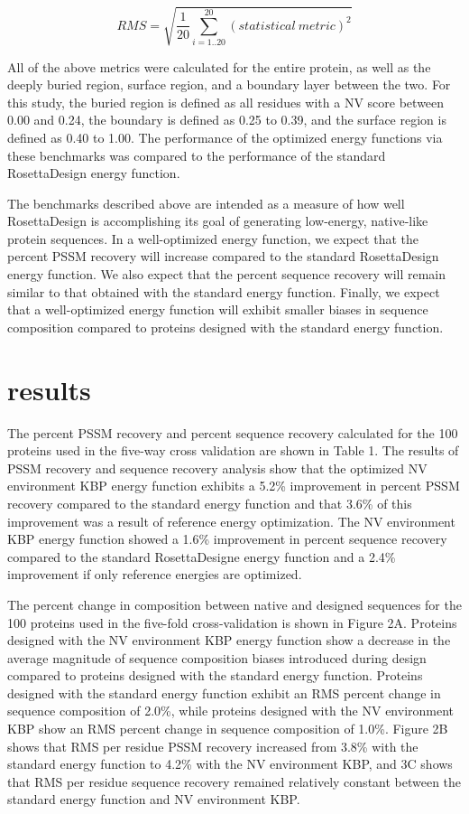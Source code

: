 \begin{equation}
RMS=\sqrt{\frac{1}{20}\sum^{20}_{i=1..20}(statistical\ metric)^{2}}
\end{equation}

All of the above metrics were calculated for the entire protein, as well as the deeply buried region, surface region, and a boundary layer between the two.
For this study, the buried region is defined as all residues with a NV score between 0.00 and 0.24, the boundary is defined as 0.25 to 0.39, and the surface region is defined as 0.40 to 1.00.
The performance of the optimized energy functions via these benchmarks was compared to the performance of the standard RosettaDesign energy function.

The benchmarks described above are intended as a measure of how well RosettaDesign is accomplishing its goal of generating low-energy, native-like protein sequences.
In a well-optimized energy function, we expect that the percent PSSM recovery will increase compared to the standard RosettaDesign energy function.
We also expect that the percent sequence recovery will remain similar to that obtained with the standard energy function.
Finally, we expect that a well-optimized energy function will exhibit smaller biases in sequence composition compared to proteins designed with the standard energy function.

\section{results}

The percent PSSM recovery and percent sequence recovery calculated for the 100 proteins used in the five-way cross validation are shown in Table 1.
The results of PSSM recovery and sequence recovery analysis show that the optimized NV environment KBP energy function exhibits a 5.2\% improvement in percent PSSM recovery compared to the standard energy function and that 3.6\% of this improvement was a result of reference energy optimization.
The NV environment KBP energy function showed a 1.6\% improvement in percent sequence recovery compared to the standard RosettaDesigne energy function and a 2.4\% improvement if only reference energies are optimized.  

The percent change in composition between native and designed sequences for the 100 proteins used in the five-fold cross-validation is shown in Figure 2A.
Proteins designed with the NV environment KBP energy function show a decrease in the average magnitude of sequence composition biases introduced during design compared to proteins designed with the standard energy function.
Proteins designed with the standard energy function exhibit an RMS percent change in sequence composition of 2.0\%, while proteins designed with the NV environment KBP show an RMS percent change in sequence composition of 1.0\%.
Figure 2B shows that RMS per residue PSSM recovery increased from 3.8\% with the standard energy function to 4.2\% with the NV environment KBP, and 3C shows that RMS per residue sequence recovery remained relatively constant between the standard energy function and NV environment KBP. 

